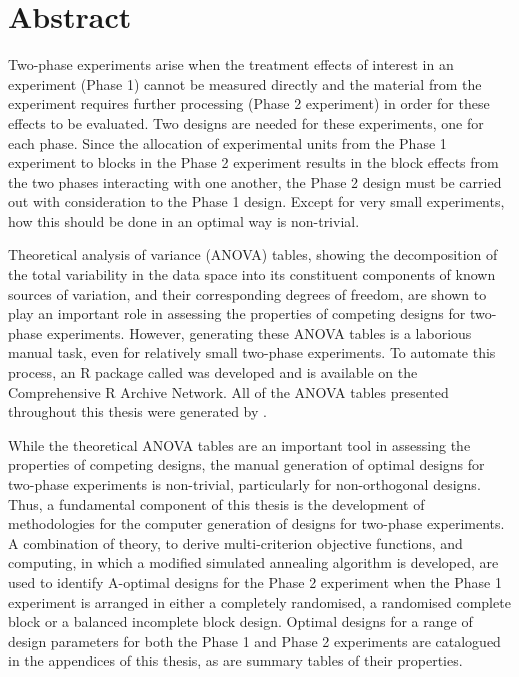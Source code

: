 \chapter*{Abstract}
Two-phase experiments arise when the treatment effects of interest in an experiment (Phase 1) cannot be measured directly and the material from the experiment requires further processing (Phase 2 experiment) in order for these effects to be evaluated. Two designs are needed for these experiments, one for each phase. Since the allocation of experimental units from the Phase 1 experiment to blocks in the Phase 2 experiment results in the block effects from the two phases interacting with one another, the Phase 2 design must be carried out with consideration to the Phase 1 design. Except for very small experiments, how this should be done in an optimal way is non-trivial.

Theoretical analysis of variance (ANOVA) tables, showing the decomposition of the total variability in the data space into its constituent components of known sources of variation, and their corresponding degrees of freedom, are shown to play an important role in assessing the properties of competing designs for two-phase experiments. However, generating these ANOVA tables is a laborious manual task, even for relatively small two-phase experiments. To automate this process, an \textsf{R} package called  was developed and is available on the Comprehensive \textsf{R} Archive Network. All of the ANOVA tables presented throughout this thesis were generated by .

While the theoretical ANOVA tables are an important tool in assessing the properties of competing designs, the manual generation of optimal designs for two-phase experiments is non-trivial, particularly for non-orthogonal designs.  Thus, a fundamental component of this thesis is the development of methodologies for the computer generation of designs for two-phase experiments. A combination of theory, to derive multi-criterion objective functions, and computing, in which a modified simulated annealing algorithm is developed, are used to identify A-optimal designs for the Phase 2 experiment when the Phase 1 experiment is arranged in either a completely randomised, a randomised complete block or a balanced incomplete block design. Optimal designs for a range of design parameters for both the Phase 1 and Phase 2 experiments are catalogued in the appendices of this thesis, as are summary tables of their properties. 

